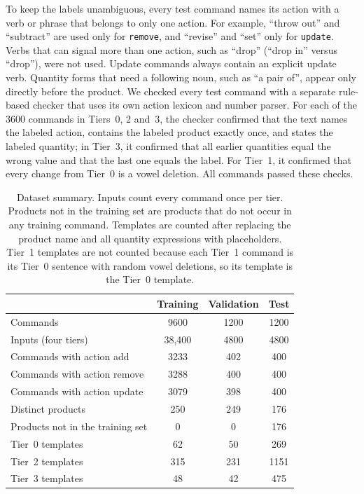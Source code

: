 \documentclass[journal,article,submit,pdftex,moreauthors]{Definitions/mdpi}
\begin{document}
To keep the labels unambiguous, every test command names its action with a verb or phrase that belongs to only one action. For example, ``throw out'' and ``subtract'' are used only for \texttt{remove}, and ``revise'' and ``set'' only for \texttt{update}. Verbs that can signal more than one action, such as ``drop'' (``drop in'' versus ``drop''), were not used. Update commands always contain an explicit update verb. Quantity forms that need a following noun, such as ``a pair of'', appear only directly before the product. We checked every test command with a separate rule-based checker that uses its own action lexicon and number parser. For each of the 3600 commands in Tiers~0, 2 and~3, the checker confirmed that the text names the labeled action, contains the labeled product exactly once, and states the labeled quantity; in Tier~3, it confirmed that all earlier quantities equal the wrong value and that the last one equals the label. For Tier~1, it confirmed that every change from Tier~0 is a vowel deletion. All commands passed these checks.

\begin{table}[H]
\caption{Dataset summary. Inputs count every command once per tier. Products not in the training set are products that do not occur in any training command. Templates are counted after replacing the product name and all quantity expressions with placeholders. Tier~1 templates are not counted because each Tier~1 command is its Tier~0 sentence with random vowel deletions, so its template is the Tier~0 template.\label{tab:data}}
\begin{tabularx}{\textwidth}{lCCC}
\toprule
 & Training & Validation & Test \\
\midrule
Commands & 9600 & 1200 & 1200 \\
Inputs (four tiers) & 38,400 & 4800 & 4800 \\
\midrule
Commands with action add & 3233 & 402 & 400 \\
Commands with action remove & 3288 & 400 & 400 \\
Commands with action update & 3079 & 398 & 400 \\
\midrule
Distinct products & 250 & 249 & 176 \\
Products not in the training set & 0 & 0 & 176 \\
\midrule
Tier~0 templates & 62 & 50 & 269 \\
Tier~2 templates & 315 & 231 & 1151 \\
Tier~3 templates & 48 & 42 & 475 \\
\bottomrule
\end{tabularx}
\end{table}
\end{document}
